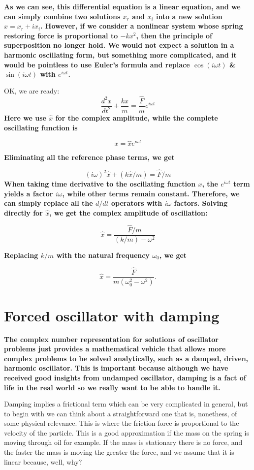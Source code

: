 \documentclass[]{revtex4}
\newcommand{\st}[1]{{\color{red}\bfseries #1}}
\begin{document}
\st{
As we can see, this differential equation is a linear equation, and we can simply combine two solutions $x_r$ and $x_i$ into a new solution $\hat{x} = x_r + ix_i$. However, if we consider a nonlinear system whose spring restoring force is proportional to $-kx^2$, then the principle of superposition no longer hold. We would not expect a solution in a harmonic oscillating form, but something more complicated, and it would be pointless to use Euler's formula and replace $\cos(i\omega t)$ \& $\sin(i\omega t)$ with $e^{i\omega t}$.
}

OK, we are ready:
\[\frac{d^2 x}{dt^2}+\frac{k x}{m} = \frac{\widehat{F}}{m}e^{i\omega t}\]
\st{
  Here we use $\hat{x}$ for the complex amplitude, while the complete oscillating function is
}

\[x = \hat{x}e^{i\omega t}\]
\st{
Eliminating all the reference phase terms, we get

}

\[(i\omega)^2\hat{x}+(k\hat{x}/m)=\widehat{F}/m\]
\st{
When taking time derivative to the oscillating function $x$, the $e^{i\omega t}$ term yields a factor $i\omega$, while other terms remain constant. Therefore, we can simply replace all the $d/dt$ operators with $i\omega$ factors. Solving directly for $\hat{x}$, we get the complex amplitude of oscillation:
}

\[\hat{x}=\frac{\widehat{F}/m}{(k/m)-\omega^2}\]
\st{
Replacing $k/m$ with the natural frequency $\omega_0$, we get

}
\[\hat{x}=\frac{\widehat{F}}{m(\omega_0^2-\omega^2)}.\]

\section*{Forced oscillator with damping}
\st{The complex number representation for solutions of oscillator problems just provides a mathematical vehicle that allows more complex problems to be solved analytically, such as a damped, driven, harmonic oscillator.  This is important because although we have received good insights from undamped oscillator, damping is a fact of life in the real world so we really want to be able to handle it.
  
  Damping implies a frictional term which can be very complicated in general, but to begin with we can think about a straightforward one that is, nonethess, of some physical relevance.  This is where the friction force is proportional to the velocity of the particle.  This is a good approximation if the mass on the spring is moving through oil for example.  If the mass is stationary there is no force, and the faster the mass is moving the greater the force, and we assume that it is linear because, well, why?}
\end{document}
